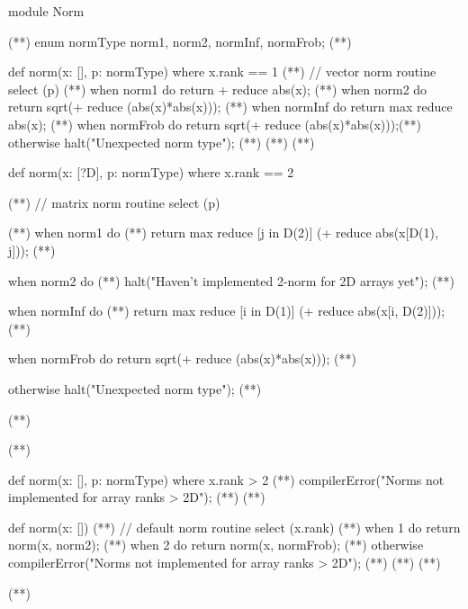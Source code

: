\begin{numberedchapel}
module Norm{                                    (*\label{norm_start}*)
  enum normType {norm1, norm2, normInf, normFrob}; (*\label{norm_enum}*)

  def norm(x: [], p: normType) where x.rank == 1 { (*\label{vec_start}*)
  // vector norm routine
    select (p) {                                   (*\label{vec_select_start}*)
      when norm1 do return + reduce abs(x);        (*\label{vec_norm1}*)
      when norm2 do return sqrt(+ reduce (abs(x)*abs(x)));  (*\label{vec_norm2}*)
      when normInf do return max reduce abs(x);  (*\label{vec_normInf}*)
      when normFrob do return sqrt(+ reduce (abs(x)*abs(x)));(*\label{vec_normFrob}*)
      otherwise halt("Unexpected norm type"); (*\label{vec_unexp}*)
    } (*\label{vec_select_end}*)
  } (*\label{vec_end}*)

  def norm(x: [?D], p: normType) where x.rank == 2 { (*\label{mat_start}*)
  // matrix norm routine
    select (p) {                                     (*\label{mat_select_start}*)
      when norm1 do                                  (*\label{mat_norm1_1}*)
        return max reduce [j in D(2)] (+ reduce abs(x[D(1), j])); (*\label{mat_norm1_2}*)

      when norm2 do  (*\label{mat_norm2_1}*)
        halt("Haven't implemented 2-norm for 2D arrays yet"); (*\label{mat_norm2_2}*)

      when normInf do  (*\label{mat_normInf_1}*)
        return max reduce [i in D(1)] (+ reduce abs(x[i, D(2)])); (*\label{mat_normInf_2}*)

      when normFrob do return sqrt(+ reduce (abs(x)*abs(x))); (*\label{mat_normFrob}*)

      otherwise halt("Unexpected norm type"); (*\label{mat_unexp}*)
    } (*\label{mat_select_end}*)
  } (*\label{mat_end}*)

  def norm(x: [], p: normType) where x.rank > 2 { (*\label{large_rank_start}*)
    compilerError("Norms not implemented for array ranks > 2D"); (*\label{comp_err_1}*)
  } (*\label{large_rank_end}*)

  def norm(x: []) { (*\label{norm_default_start}*)
  // default norm routine
    select (x.rank) { (*\label{default_select_start}*)
      when 1 do return norm(x, norm2);  (*\label{default_vec}*)
      when 2 do return norm(x, normFrob); (*\label{default_mat}*)
      otherwise compilerError("Norms not implemented for array ranks > 2D"); (*\label{comp_err_2}*)
    }   (*\label{default_select_end}*)
  }  (*\label{norm_default_end}*)
} (*\label{norm_end}*)


\end{numberedchapel}
